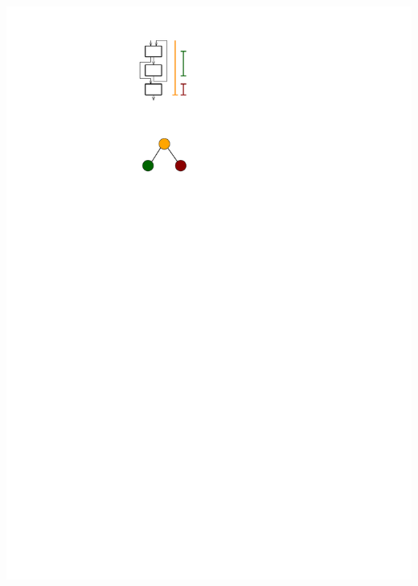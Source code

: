 \documentclass[navbaroff,en]{sdqbeamer}
\begin{document}
\begin{frame}[noframenumbering]
\begin{columns}
	\begin{column}{0.35\textwidth}
		\vspace{40pt}
		\vfill
		\centering \includegraphics[scale=0.7]{images/techniques.pdf}
	\end{column}
\end{columns}

\end{frame}
\end{document}
